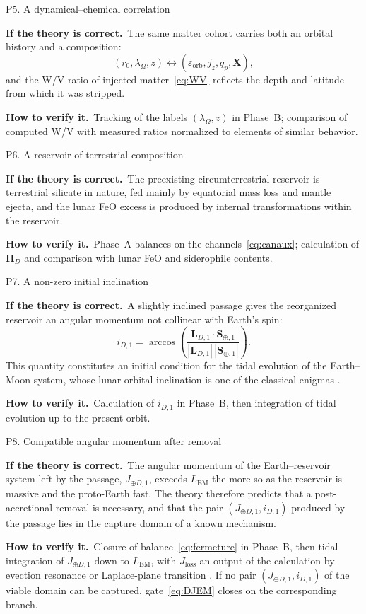 \documentclass[11pt,a4paper,openany]{report}
\newcommand{\sila}{\par\noindent\textbf{If the theory is correct.}\ }
\newcommand{\verif}{\par\smallskip\noindent\textbf{How to verify it.}\ }
\begin{document}
\begin{prediction}{P5. A dynamical--chemical correlation}
\sila The same matter cohort carries both an orbital history and a composition:
\begin{equation}
(r_0,\lambda_\Omega,z)\longleftrightarrow(\varepsilon_{\mathrm{orb}},j_z,q_p,\mathbf{X}),
\label{eq:correlation}
\end{equation}
and the W/V ratio of injected matter~\eqref{eq:WV} reflects the depth and latitude from which it was
stripped.
\verif Tracking of the labels $(\lambda_\Omega,z)$ in Phase~B; comparison of computed W/V with
measured ratios normalized to elements of similar behavior.
\end{prediction}

\begin{prediction}{P6. A reservoir of terrestrial composition}
\sila The preexisting circumterrestrial reservoir is terrestrial silicate in nature, fed mainly by
equatorial mass loss and mantle ejecta, and the lunar FeO excess is produced by internal
transformations within the reservoir.
\verif Phase~A balances on the channels~\eqref{eq:canaux}; calculation of $\boldsymbol{\Pi}_D$ and
comparison with lunar FeO and siderophile contents.
\end{prediction}

\begin{prediction}{P7. A non-zero initial inclination}
\sila A slightly inclined passage gives the reorganized reservoir an angular momentum not collinear
with Earth's spin:
\begin{equation}
i_{D,1}=\arccos\!\left(\frac{\mathbf{L}_{D,1}\cdot\mathbf{S}_{\oplus,1}}
{|\mathbf{L}_{D,1}|\,|\mathbf{S}_{\oplus,1}|}\right).
\label{eq:inclinaison}
\end{equation}
This quantity constitutes an initial condition for the tidal evolution of the Earth--Moon system,
whose lunar orbital inclination is one of the classical enigmas \cite{PahlevanMorbidelli2015}.
\verif Calculation of $i_{D,1}$ in Phase~B, then integration of tidal evolution up to the present
orbit.
\end{prediction}

\begin{prediction}{P8. Compatible angular momentum after removal}
\sila The angular momentum of the Earth--reservoir system left by the passage, $J_{\oplus D,1}$,
exceeds $L_{\mathrm{EM}}$ the more so as the reservoir is massive and the proto-Earth fast. The
theory therefore predicts that a post-accretional removal is necessary, and that the pair
$(J_{\oplus D,1},i_{D,1})$ produced by the passage lies in the capture domain of a known mechanism.
\verif Closure of balance~\eqref{eq:fermeture} in Phase~B, then tidal integration of
$J_{\oplus D,1}$ down to $L_{\mathrm{EM}}$, with $J_{\mathrm{loss}}$ an output of the calculation
by evection resonance or Laplace-plane transition
\cite{MurrayDermott1999,TremaineTouma2009}. If no pair $(J_{\oplus D,1},i_{D,1})$ of the viable
domain can be captured, gate~\eqref{eq:DJEM} closes on the corresponding branch.
\end{prediction}
\end{document}
